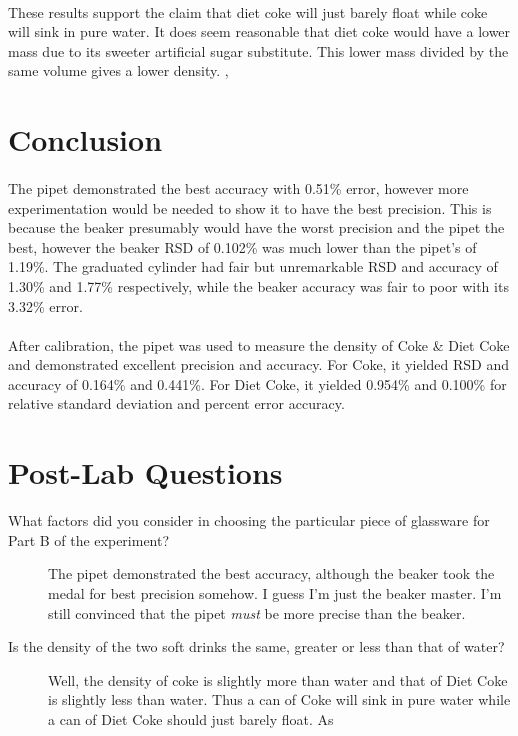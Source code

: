 \documentclass[fleqn,titlepage]{article}
\begin{document}
    \paragraph{} These results support the claim that diet coke will just barely float while coke will sink in pure water. It does seem reasonable that diet coke would have a lower mass due to its sweeter artificial sugar substitute. This lower mass divided by the same volume gives a lower density.
, 
\section*{Conclusion}
  \paragraph{} The pipet demonstrated the best accuracy with 0.51\% error, however more experimentation would be needed to show it to have the best precision. This is because the beaker presumably would have the worst precision and the pipet the best, however the beaker RSD of 0.102\% was much lower than the pipet's of 1.19\%. The graduated cylinder had fair but unremarkable RSD and accuracy of 1.30\% and 1.77\% respectively, while the beaker accuracy was fair to poor with its 3.32\% error. 

  \paragraph{} After calibration, the pipet was used to measure the density of Coke \& Diet Coke and demonstrated excellent precision and accuracy. For Coke, it yielded RSD and accuracy of 0.164\% and 0.441\%. For Diet Coke, it yielded 0.954\% and 0.100\% for relative standard deviation and percent error accuracy.

\section*{Post-Lab Questions}
  \begin{description}
    \item[What factors did you consider in choosing the particular piece of glassware for Part B of the
    experiment?] The pipet demonstrated the best accuracy, although the beaker took the medal for best precision somehow. I guess I'm just the beaker master. I'm still convinced that the pipet \emph{must} be more precise than the beaker.
    \item[Is the density of the two soft drinks the same, greater or less than that of water?] Well, the density of coke is slightly more than water and that of Diet Coke is slightly less than water. Thus a can of Coke will sink in pure water while a can of Diet Coke should just barely float. As
  \end{description}
\end{document}
